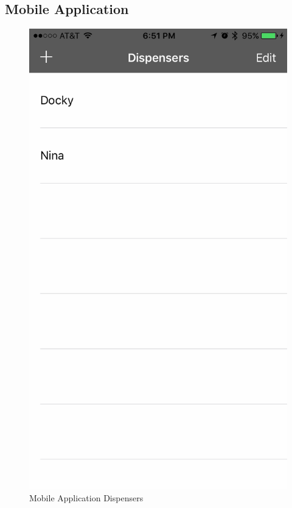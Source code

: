 \documentclass[12pt]{article}
\begin{document}
\begin{appendix}
  \newpage

  \section{Mobile Application} \label{App:MobileApplication}

  \begin{figure}[!htb]
    \begin{center}
        \includegraphics[scale=0.15]{Figures/iOSApp1.png}
    \end{center}
    \caption{Mobile Application Dispensers}
    \label{fig:iOSApp1}
  \end{figure}


\end{appendix}
\end{document}

